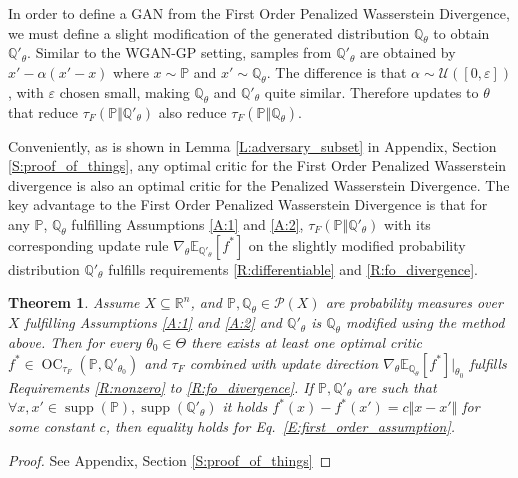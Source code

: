 \documentclass{article}
\DeclareMathOperator{\supp}{supp}
\DeclareMathOperator{\oc}{OC}
\newtheorem{theorem}{Theorem}
\begin{document}
 In order to define a GAN from the First Order Penalized Wasserstein Divergence, we must define a slight modification of
 the generated distribution $\mathbb Q_\theta$ to obtain $\mathbb Q'_\theta$. Similar to the WGAN-GP setting,
 samples from $\mathbb Q'_\theta$ are obtained by $x'-\alpha(x'-x)$ where $x\sim\mathbb P$ and $x'\sim\mathbb Q_\theta$.
 The difference is that $\alpha\sim\mathcal U([0,\varepsilon])$, with $\varepsilon$ chosen small, making $\mathbb Q_\theta$
 and $\mathbb Q'_\theta$ quite similar. Therefore updates to $\theta$ that reduce $\tau_F(\mathbb P\Vert\mathbb Q'_\theta)$ also reduce
 $\tau_F(\mathbb P\Vert\mathbb Q_\theta)$.
 
 Conveniently, as is shown in Lemma \ref{L:adversary_subset} in Appendix, Section \ref{S:proof_of_things},
 any optimal critic for the First Order Penalized Wasserstein divergence
 is also an optimal critic for the Penalized Wasserstein Divergence.  
 The key advantage to the First Order Penalized Wasserstein Divergence is that for any $\mathbb P$, $\mathbb Q_\theta$ fulfilling Assumptions \ref{A:1}
 and \ref{A:2}, $\tau_F(\mathbb P\Vert\mathbb Q'_\theta)$ with its corresponding update rule
 $\nabla_\theta\mathbb E_{\mathbb Q'_\theta}[f^*]$ on the slightly modified probability distribution $\mathbb Q'_\theta$
  fulfills requirements \ref{R:differentiable} and \ref{R:fo_divergence}.
 

 \begin{theorem}\label{T:fogan_theorem}
  Assume $X\subseteq\mathbb R^n$, and $\mathbb P,\mathbb Q_\theta\in\mathcal P(X)$ are probability measures over
  $X$ fulfilling Assumptions \ref{A:1} and \ref{A:2} and $\mathbb Q'_\theta$ is $\mathbb Q_\theta$ modified
  using the method above.
  Then for every $\theta_0\in\Theta$ there exists at least one optimal critic $f^*\in\oc_{\tau_F}(\mathbb P,\mathbb Q'_{\theta_0})$
  and $\tau_F$ combined with update direction $\nabla_\theta\mathbb E_{\mathbb Q_\theta}[f^*]|_{\theta_0}$ fulfills 
  Requirements \ref{R:nonzero} to \ref{R:fo_divergence}. If $\mathbb P,\mathbb Q'_\theta$ are such that $\forall x,x'\in\supp(\mathbb P),\supp(\mathbb Q'_\theta)$
  it holds $f^*(x)-f^*(x')=c\Vert x-x'\Vert$ for some constant $c$, then equality holds for Eq.\ \ref{E:first_order_assumption}.
 \end{theorem}
 \begin{proof}
  See Appendix, Section \ref{S:proof_of_things}
 \end{proof}
\end{document}
